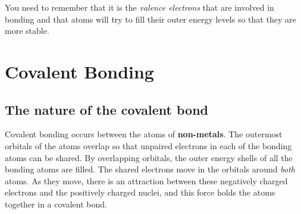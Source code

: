 You need to remember that it is the \textit{valence electrons} that are involved in bonding and that atoms will try to fill their outer energy levels so that they are more stable.






\section{Covalent Bonding}
\label{subsec:bonding:covalent}

\subsection{The nature of the covalent bond}

Covalent bonding occurs between the atoms of \textbf{non-metals}. The outermost orbitals of the atoms overlap so that unpaired electrons in each of the bonding atoms can be shared. By overlapping orbitals, the outer energy shells of all the bonding atoms are filled. The shared electrons move in the orbitals around \textit{both} atoms. As they move, there is an attraction between these negatively charged electrons and the positively charged nuclei, and this force holds the atoms together in a covalent bond.


